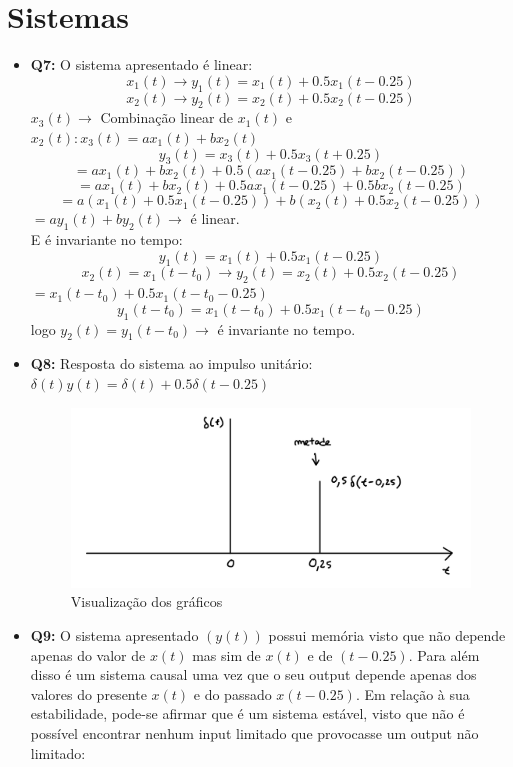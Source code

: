 \documentclass[a4paper, 12pt]{article}
\begin{document}
\newpage
\section{Sistemas}
\begin{itemize}
    \item \textbf{Q7:} O sistema apresentado é linear:
          \[x_1(t) \to y_1(t) = x_1(t) + 0.5x_1(t - 0.25)\]
          \[x_2(t) \to y_2(t) = x_2(t) + 0.5x_2(t - 0.25)\]
          $x_3(t) \to$ Combinação linear de $x_1(t)$ e $x_2(t) : x_3(t) = ax_1(t) + bx_2(t)$\vspace{-5px}
          \[y_3(t) = x_3(t) + 0.5x_3(t + 0.25)\]
          \[= ax_1(t) + bx_2(t  ) + 0.5(ax_1(t - 0.25) + bx_2(t - 0.25))\]
          \[= ax_1(t) + bx_2(t) + 0.5ax_1(t - 0.25) + 0.5bx_2(t - 0.25)\]
          \[= a(x_1(t) + 0.5x_1(t - 0.25)) + b(x_2(t) + 0.5x_2(t- 0.25))\]
          \hspace{105px}$= ay_1(t) + by_2(t) \to$ é linear.\\\vspace{-9px}
          E é invariante no tempo:
          \[y_1(t) = x_1(t) + 0.5x_1(t - 0.25)\]
          \[x_2(t) = x_1(t - t_0) \to y_2(t) = x_2(t) + 0.5x_2(t - 0.25)\]
          \hspace{184px}$= x_1(t - t_0) + 0.5x_1(t- t_0 - 0.25)$
          \[y_1(t - t_0) = x_1(t - t_0) + 0.5x_1(t - t_0 - 0.25)\]
          \hspace{57px}logo $y_2(t) = y_1(t - t_0) \to$ é invariante no tempo.
    \item \textbf{Q8:} Resposta do sistema ao impulso unitário: $\delta(t)y(t) = \delta(t) + 0.5\delta(t - 0.25)$
          \begin{figure}[!ht]
              \includegraphics[width=12cm]{images/Graf3.png}
              \vspace{-15px}
              \caption{Visualização dos gráficos}
          \end{figure}
    \item \textbf{Q9:} O sistema apresentado $(y(t))$ possui memória visto que não depende apenas do valor de $x(t)$ mas sim de $x(t)$ e de $(t - 0.25)$. Para além disso é um sistema causal uma vez que o seu output depende apenas dos valores do presente $x(t)$ e do passado $x(t - 0.25)$. Em relação à sua estabilidade, pode-se afirmar que é um sistema estável, visto que não é possível encontrar nenhum input limitado que provocasse um output não limitado:\\

\end{itemize}
\end{document}
